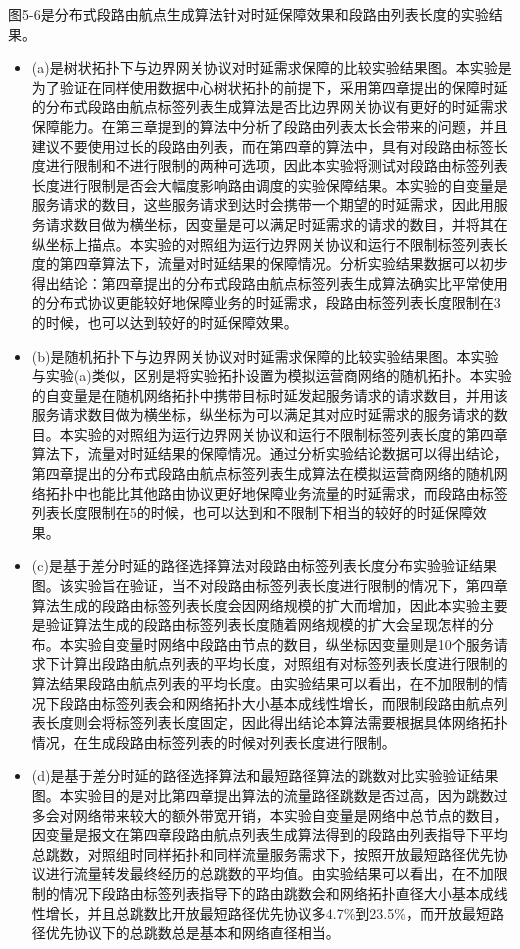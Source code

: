 图5-6是分布式段路由航点生成算法针对时延保障效果和段路由列表长度的实验结果。

\begin{itemize}
\item (a)是树状拓扑下与边界网关协议对时延需求保障的比较实验结果图。本实验是为了验证在同样使用数据中心树状拓扑的前提下，采用第四章提出的保障时延的分布式段路由航点标签列表生成算法是否比边界网关协议有更好的时延需求保障能力。在第三章提到的算法中分析了段路由列表太长会带来的问题，并且建议不要使用过长的段路由列表，而在第四章的算法中，具有对段路由标签长度进行限制和不进行限制的两种可选项，因此本实验将测试对段路由标签列表长度进行限制是否会大幅度影响路由调度的实验保障结果。本实验的自变量是服务请求的数目，这些服务请求到达时会携带一个期望的时延需求，因此用服务请求数目做为横坐标，因变量是可以满足时延需求的请求的数目，并将其在纵坐标上描点。本实验的对照组为运行边界网关协议和运行不限制标签列表长度的第四章算法下，流量对时延结果的保障情况。分析实验结果数据可以初步得出结论：第四章提出的分布式段路由航点标签列表生成算法确实比平常使用的分布式协议更能较好地保障业务的时延需求，段路由标签列表长度限制在3的时候，也可以达到较好的时延保障效果。
\item (b)是随机拓扑下与边界网关协议对时延需求保障的比较实验结果图。本实验与实验(a)类似，区别是将实验拓扑设置为模拟运营商网络的随机拓扑。本实验的自变量是在随机网络拓扑中携带目标时延发起服务请求的请求数目，并用该服务请求数目做为横坐标，纵坐标为可以满足其对应时延需求的服务请求的数目。本实验的对照组为运行边界网关协议和运行不限制标签列表长度的第四章算法下，流量对时延结果的保障情况。通过分析实验结论数据可以得出结论，第四章提出的分布式段路由航点标签列表生成算法在模拟运营商网络的随机网络拓扑中也能比其他路由协议更好地保障业务流量的时延需求，而段路由标签列表长度限制在5的时候，也可以达到和不限制下相当的较好的时延保障效果。
\item (c)是基于差分时延的路径选择算法对段路由标签列表长度分布实验验证结果图。该实验旨在验证，当不对段路由标签列表长度进行限制的情况下，第四章算法生成的段路由标签列表长度会因网络规模的扩大而增加，因此本实验主要是验证算法生成的段路由标签列表长度随着网络规模的扩大会呈现怎样的分布。本实验自变量时网络中段路由节点的数目，纵坐标因变量则是10个服务请求下计算出段路由航点列表的平均长度，对照组有对标签列表长度进行限制的算法结果段路由航点列表的平均长度。由实验结果可以看出，在不加限制的情况下段路由标签列表会和网络拓扑大小基本成线性增长，而限制段路由航点列表长度则会将标签列表长度固定，因此得出结论本算法需要根据具体网络拓扑情况，在生成段路由标签列表的时候对列表长度进行限制。
\item (d)是基于差分时延的路径选择算法和最短路径算法的跳数对比实验验证结果图。本实验目的是对比第四章提出算法的流量路径跳数是否过高，因为跳数过多会对网络带来较大的额外带宽开销，本实验自变量是网络中总节点的数目，因变量是报文在第四章段路由航点列表生成算法得到的段路由列表指导下平均总跳数，对照组时同样拓扑和同样流量服务需求下，按照开放最短路径优先协议进行流量转发最终经历的总跳数的平均值。由实验结果可以看出，在不加限制的情况下段路由标签列表指导下的路由跳数会和网络拓扑直径大小基本成线性增长，并且总跳数比开放最短路径优先协议多4.7\%到23.5\%，而开放最短路径优先协议下的总跳数总是基本和网络直径相当。
\end{itemize}

